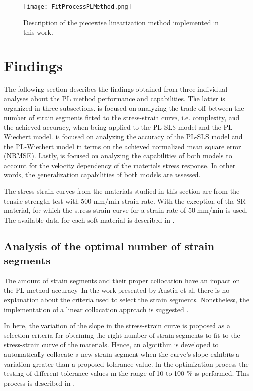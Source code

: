 \begin{figure}[H]
	\centering
	\texttt{[image: FitProcessPLMethod.png]}
	\caption{ Description of the piecewise linearization method implemented in this work.}
	\label{fig:FCFittingProcess}
\end{figure}

\newpage

\section{Findings}

The following section describes the findings obtained from three individual analyses about the PL method performance and capabilities. The latter is organized in three subsections.  is focused on analyzing the trade-off between the number of strain segments fitted to the stress-strain curve, i.e. complexity, and the achieved accuracy, when being applied to the PL-SLS model and the PL-Wiechert model.  is focused on analyzing the accuracy of the PL-SLS model and the PL-Wiechert model in terms on the achieved normalized mean square error (NRMSE). Lastly,  is focused on analyzing the capabilities of both models to account for the velocity dependency of the materials stress response. In other words, the generalization capabilities of both models are assessed.

The stress-strain curves from the materials studied in this section are from the tensile strength test with 500 mm/min strain rate. With the exception of the SR material, for which the stress-strain curve for a strain rate of 50 mm/min is used. The available data for each soft material is described in .

\subsection{Analysis of the optimal number of strain segments} \label{SegmentAnalysis}

The amount of strain segments and their proper collocation have an impact on the PL method accuracy. In the work presented by Austin et al. there is no explanation about the criteria used to select the strain segments. Nonetheless, the implementation of a linear collocation approach is suggested \cite{austin2015control}. 

In here, the variation of the slope in the stress-strain curve is proposed as a selection criteria for obtaining the right number of strain segments to fit to the stress-strain curve of the materials. Hence, an algorithm is developed to automatically collocate a new strain segment when the curve's slope exhibits a variation greater than a proposed tolerance value. In the optimization process the testing of different tolerance values in the range of 10 to 100 \% is performed. This process is described in . 

